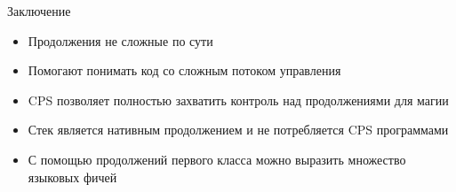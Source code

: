     \begin{frame}[fragile]{Заключение}
        \begin{itemize}
            \item Продолжения не сложные по сути
            \item Помогают понимать код со сложным потоком управления
            \item CPS позволяет полностью захватить контроль над продолжениями для магии
            \item Стек является нативным продолжением и не потребляется CPS программами
            \item С помощью продолжений первого класса можно выразить множество языковых фичей
        \end{itemize}
    \end{frame}


